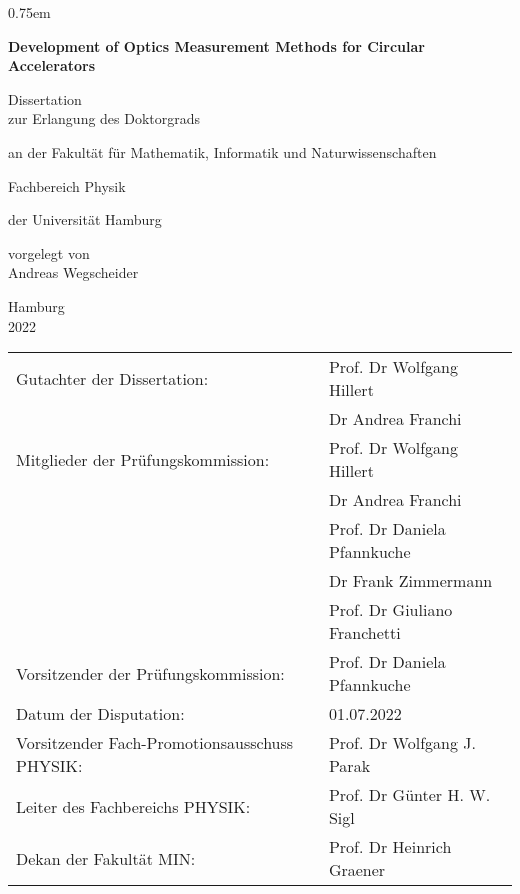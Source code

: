 \thispagestyle{empty}
\vspace{5cm}
\parskip0.75em
\begin{center}
    \Huge\bfseries
    Development of Optics Measurement Methods for Circular Accelerators

    \vspace{3cm}
    \mdseries\Large
    Dissertation\\
    \vspace{1em}
    zur Erlangung des Doktorgrads

    an der Fakult\"at f\"ur Mathematik, Informatik und Naturwissenschaften
    
    Fachbereich Physik
    
    \vspace{1em}
    der Universit\"at Hamburg

    \vspace{2cm}
    \vfill
    vorgelegt von\\
    Andreas Wegscheider
    \vspace{2em}

    Hamburg\\
    2022
\end{center}
\cleardoublepage
{}

\thispagestyle{empty}
\renewcommand\baselinestretch{1.5}\selectfont
\begin{tabular}{ll}
   Gutachter der Dissertation:%
   & Prof. Dr Wolfgang Hillert\\
   & Dr Andrea Franchi \vspace{1em} \\ 
   Mitglieder der Prüfungskommission:%
   & Prof. Dr Wolfgang Hillert\\
   & Dr Andrea Franchi\\
   & Prof. Dr Daniela Pfannkuche \\
   & Dr Frank Zimmermann\\
   & Prof. Dr Giuliano Franchetti \vspace{1.0em}  \\
   Vorsitzender der Prüfungskommission: & Prof. Dr Daniela Pfannkuche \vspace{1.0em}  \\
   Datum der Disputation: & 01.07.2022 \vspace{1.0em} \\
   Vorsitzender Fach-Promotionsausschuss PHYSIK: & Prof. Dr Wolfgang J. Parak \vspace{0.5em}  \\
   Leiter des Fachbereichs PHYSIK: & Prof. Dr Günter H. W. Sigl \vspace{0.5em}  \\
   Dekan der Fakultät MIN: & Prof. Dr Heinrich Graener
\end{tabular}

